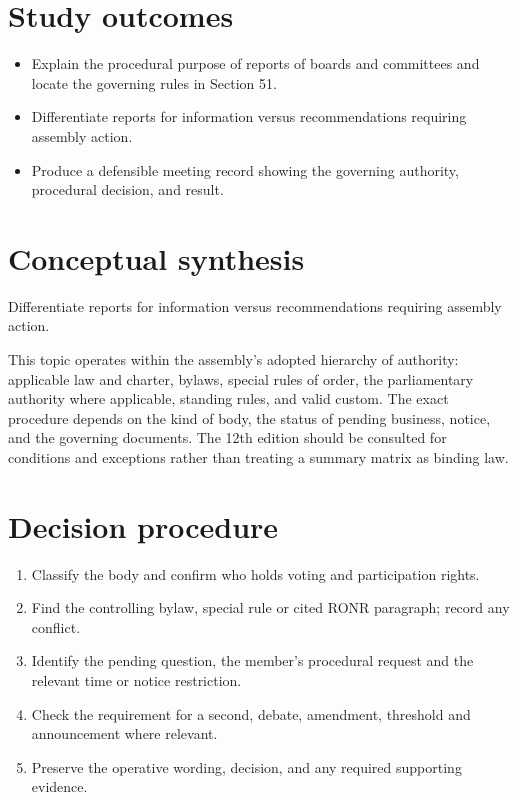 \documentclass[11pt]{article}
\begin{document}
\SuiteOpen
{}
\section{Study outcomes}
\begin{itemize}[leftmargin=*,itemsep=4pt]
\item Explain the procedural purpose of reports of boards and committees and locate the governing rules in Section 51.
\item Differentiate reports for information versus recommendations requiring assembly action.
\item Produce a defensible meeting record showing the governing authority, procedural decision, and result.
\end{itemize}

\section{Conceptual synthesis}
Differentiate reports for information versus recommendations requiring assembly action.

This topic operates within the assembly’s adopted hierarchy of authority: applicable law and charter, bylaws, special rules of order, the parliamentary authority where applicable, standing rules, and valid custom. The exact procedure depends on the kind of body, the status of pending business, notice, and the governing documents. The 12th edition should be consulted for conditions and exceptions rather than treating a summary matrix as binding law.
\section{Decision procedure}
\begin{enumerate}[leftmargin=*,itemsep=4pt]
\item Classify the body and confirm who holds voting and participation rights.
\item Find the controlling bylaw, special rule or cited RONR paragraph; record any conflict.
\item Identify the pending question, the member’s procedural request and the relevant time or notice restriction.
\item Check the requirement for a second, debate, amendment, threshold and announcement where relevant.
\item Preserve the operative wording, decision, and any required supporting evidence.
\end{enumerate}
\end{document}
